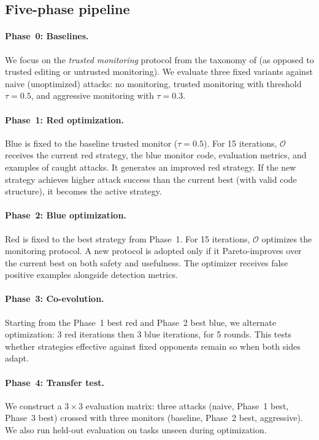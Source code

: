 \documentclass{article}
\begin{document}
\subsection{Five-phase pipeline}

\paragraph{Phase~0: Baselines.} We focus on the \emph{trusted monitoring} protocol from the taxonomy of \citet{greenblatt2024ai} (as opposed to trusted editing or untrusted monitoring). We evaluate three fixed variants against naive (unoptimized) attacks: no monitoring, trusted monitoring with threshold $\tau = 0.5$, and aggressive monitoring with $\tau = 0.3$.

\paragraph{Phase~1: Red optimization.} Blue is fixed to the baseline trusted monitor ($\tau = 0.5$). For 15 iterations, $\mathcal{O}$ receives the current red strategy, the blue monitor code, evaluation metrics, and examples of caught attacks. It generates an improved red strategy. If the new strategy achieves higher attack success than the current best (with valid code structure), it becomes the active strategy.

\paragraph{Phase~2: Blue optimization.} Red is fixed to the best strategy from Phase~1. For 15 iterations, $\mathcal{O}$ optimizes the monitoring protocol. A new protocol is adopted only if it Pareto-improves over the current best on both safety and usefulness. The optimizer receives false positive examples alongside detection metrics.

\paragraph{Phase~3: Co-evolution.} Starting from the Phase~1 best red and Phase~2 best blue, we alternate optimization: 3 red iterations then 3 blue iterations, for 5 rounds. This tests whether strategies effective against fixed opponents remain so when both sides adapt.

\paragraph{Phase~4: Transfer test.} We construct a $3 \times 3$ evaluation matrix: three attacks (naive, Phase~1 best, Phase~3 best) crossed with three monitors (baseline, Phase~2 best, aggressive). We also run held-out evaluation on tasks unseen during optimization.
\end{document}
